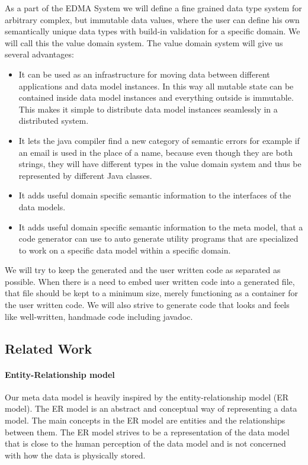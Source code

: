 As a part of the EDMA System we will define a fine grained data type
system for arbitrary complex, but immutable data values, where the
user can define his own semantically unique data types with build-in
validation for a specific domain. We will call this the value domain
system. The value domain system will give us several advantages:
\begin{itemize}
\item It can be used as an infrastructure for moving data between different
applications and data model instances. In this way all mutable state
can be contained inside data model instances and everything outside
is immutable. This makes it simple to distribute data model instances
seamlessly in a distributed system.
\item It lets the java compiler find a new category of semantic errors for
example if an email is used in the place of a name, because even though
they are both strings, they will have different types in the value
domain system and thus be represented by different Java classes.
\item It adds useful domain specific semantic information to the interfaces
of the data models.
\item It adds useful domain specific semantic information to the meta model,
that a code generator can use to auto generate utility programs that
are specialized to work on a specific data model within a specific
domain.
\end{itemize}
We will try to keep the generated and the user written code as separated
as possible. When there is a need to embed user written code into
a generated file, that file should be kept to a minimum size, merely
functioning as a container for the user written code. We will also
strive to generate code that looks and feels like well-written, handmade
code including javadoc.


\subsection{Related Work}


\paragraph{Entity-Relationship model}

Our meta data model is heavily inspired by the entity-relationship
model (ER model). The ER model is an abstract and conceptual way of
representing a data model\cite{chen1976entity}. The main concepts
in the ER model are entities and the relationships between them. The
ER model strives to be a representation of the data model that is
close to the human perception of the data model and is not concerned
with how the data is physically stored.


